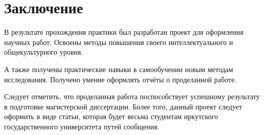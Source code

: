 \newpage
\section{Заключение}
	В результате прохождения практики был разработан проект для оформления
		научных работ\cite{norm}. Освоены методы повышения своего интеллектуального
		и общекультурного уровня.

	А также получены практические навыки в самообучении
		новым методам исследования. Получено умение оформлять отчёты о
		проделанной работе.

	Следует отметить, что проделанная работа поспособствует успешному
		результату в подготовке магистерской диссертации. Более того,
		данный проект следует оформить в виде статьи, которая будет весьма
		студентам иркутского государственного университета путей сообщения.
